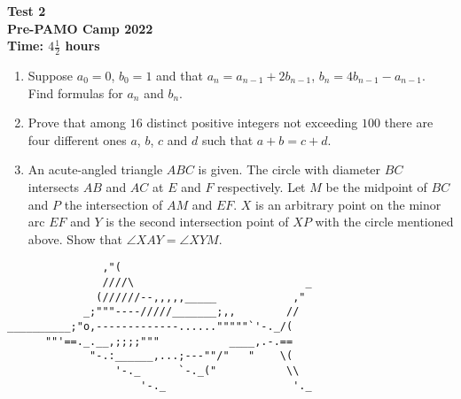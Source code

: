 \documentclass{article}
\begin{document}
	\thispagestyle{empty}
	
	\begin{center}
		\textbf{\Large Test 2}
		\\ \vspace{1em}
		\textbf{\large Pre-PAMO Camp 2022}
		\\ \vspace{1em}
		\textbf{\large Time: $4\frac{1}{2}$ hours}
	\end{center}
	
	\vspace{24pt}
	
	\begin{enumerate}[itemsep=12pt]
		
		\item 
		Suppose $a_0 = 0$, $b_0 = 1$ and that $a_n = a_{n-1} + 2b_{n-1}$, $b_n =    4b_{n-1} -a_{n-1}$. Find formulas for $a_n$ and $b_n$.
	
		\item %
		Prove that among $16$ distinct positive integers not exceeding $100$ there are four different ones $a$, $b$, $c$ and $d$ such that $a+b = c+d$.
		
		\item %
		An acute-angled triangle $ABC$ is given. The circle with diameter $BC$ intersects $AB$ and $AC$ at $E$ and $F$ respectively. Let $M$ be the midpoint of $BC$ and $P$ the intersection of $AM$ and $EF$. $X$ is an arbitrary point on the minor arc $EF$ and $Y$ is the second intersection point of $XP$ with the circle mentioned above. Show that $\angle XAY = \angle XYM$.
		
	\end{enumerate}
	
\vfill
\centering
\begin{BVerbatim}
               ,"(
               ////\                           _
              (//////--,,,,,_____            ,"
            _;"""----/////_______;,,        //
__________;"o,-------------......"""""`'-._/(
      ""'==._.__,;;;;"""           ____,.-.==
             "-.:______,...;---""/"   "    \(
                 '-._      `-._("           \\
                     '-._                    '._	
\end{BVerbatim}	
	
\end{document}
